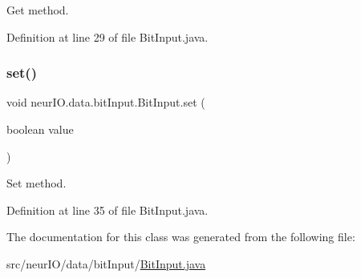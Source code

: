 Get method. 

Definition at line 29 of file Bit\+Input.\+java.

\mbox{\label{classneur_i_o_1_1data_1_1bit_input_1_1_bit_input_a0fc46f4c9962c8cf8dc0387ecd61cd66}} 
\subsubsection{\texorpdfstring{set()}{set()}}
{\footnotesize\ttfamily void neur\+I\+O.\+data.\+bit\+Input.\+Bit\+Input.\+set (\begin{DoxyParamCaption}\item[{boolean}]{value }\end{DoxyParamCaption})}

Set method. 

Definition at line 35 of file Bit\+Input.\+java.



The documentation for this class was generated from the following file\+:\begin{DoxyCompactItemize}
\item 
src/neur\+I\+O/data/bit\+Input/\hyperlink{_bit_input_8java}{Bit\+Input.\+java}\end{DoxyCompactItemize}

